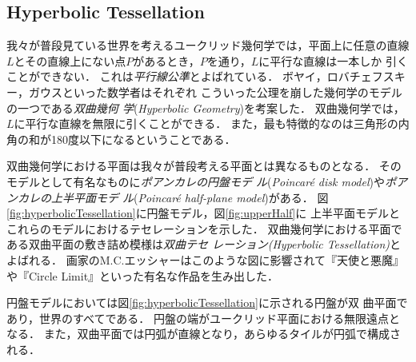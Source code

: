 \subsection{Hyperbolic Tessellation}

我々が普段見ている世界を考えるユークリッド幾何学では，平面上に任意の直線
$L$とその直線上にない点$P$があるとき，$P$を通り，$L$に平行な直線は一本しか
引くことができない．
これは\emph{平行線公準}とよばれている．
ボヤイ，ロバチェフスキー，ガウスといった数学者はそれぞれ
こういった公理を崩した幾何学のモデルの一つである\emph{双曲幾何
学}(\textit{Hyperbolic Geometry})を考案した．
双曲幾何学では，$L$に平行な直線を無限に引くことができる．
また，最も特徴的なのは三角形の内角の和が180度以下になるということである．

双曲幾何学における平面は我々が普段考える平面とは異なるものとなる．
そのモデルとして有名なものに\emph{ポアンカレの円盤モデ
ル}(\textit{Poincar\'e disk model})や\emph{ポアンカレの上半平面モデ
ル}(\textit{Poincar\'e half-plane model})がある．
図\ref{fig:hyperbolicTessellation}に円盤モデル，図\ref{fig:upperHalf}に
上半平面モデルとこれらのモデルにおけるテセレーションを示した．
双曲幾何学における平面である双曲平面の敷き詰め模様は\emph{双曲テセ
レーション}{\it (Hyperbolic Tessellation)}とよばれる．
画家のM.C.エッシャーはこのような図に影響されて『天使と悪魔』や『Circle
Limit』といった有名な作品を生み出した．

円盤モデルにおいては図\ref{fig:hyperbolicTessellation}に示される円盤が双
曲平面であり，世界のすべてである．
円盤の端がユークリッド平面における無限遠点となる．
また，双曲平面では円弧が直線となり，あらゆるタイルが円弧で構成される．

